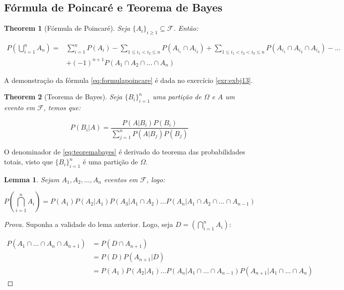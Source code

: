 \documentclass[
]{article}
\newtheorem{theorem}{Theorem}[section]
\newtheorem{lemma}{Lemma}[section]
\theoremstyle{definition}
\theoremstyle{definition}
\theoremstyle{definition}
\theoremstyle{definition}
\theoremstyle{remark}
\begin{document}
\hypertarget{fuxf3rmula-de-poincaruxe9-e-teorema-de-bayes}{%
\subsection{Fórmula de Poincaré e Teorema de Bayes}\label{fuxf3rmula-de-poincaruxe9-e-teorema-de-bayes}}

\begin{theorem}[Fórmula de Poincaré]
Seja \(\{A_{i}\}_{i \ge 1} \subseteq \mathcal{F}\). Então:

\begin{equation}
\begin{split}
P\left(\bigcup_{i=1}^{n} A_{n}\right) = &\sum_{i=1}^{n}P(A_{i}) - \sum_{1 \le i_{1} < i_{2} \le n} P(A_{i_{1}} \cap A_{i_{2}}) + \sum_{1 \le i_{1} < i_{2} < i_{3} \le n} P(A_{i_{1}} \cap A_{i_{2}} \cap A_{i_{3}}) - \dots \\
&+ (-1)^{n+1} P(A_{1} \cap A_{2} \cap \ldots \cap A_{n})
\label{eq:formulapoincare}
\end{split}
\end{equation}
\end{theorem}

A demonstração da fórmula \eqref{eq:formulapoincare} é dada no exercício \ref{exr:exbj13}.

\begin{theorem}[Teorema de Bayes]
Seja \(\{B_{i}\}_{i=1}^{n}\) uma partição de \(\Omega\) e \(A\) um evento em \(\mathcal{F}\), temos que:

\begin{equation}
P(B_{i}|A) = \frac{P(A|B_{i})P(B_{i})}{\sum_{j=1}^{n}P(A|B_{j})P(B_{j})}
\label{eq:teoremabayes}
\end{equation}
\end{theorem}

O denominador de \eqref{eq:teoremabayes} é derivado do teorema das probabilidades totais, visto que \(\{B_{i}\}_{i=1}^{n}\) é uma partição de \(\Omega\).

\begin{lemma}
Sejam \(A_{1},A_{2}, \ldots, A_{n}\) eventos em \(\mathcal{F}\), logo:

\begin{equation*}
P\left(\bigcap_{i=1}^{n}A_{i}\right) = P(A_{1})P(A_{2}|A_{1})P(A_{3}|A_{1} \cap A_{2}) \ldots P(A_{n}|A_{1} \cap A_{2} \cap \ldots \cap A_{n-1})
\end{equation*}
\end{lemma}

\begin{proof}[Prova]
Suponha a validade do lema anterior. Logo, seja \(D = (\bigcap_{i=1}^{n}A_{i})\):

\begin{align*}
P(A_{1} \cap \ldots \cap A_{n} \cap A_{n+1}) &= P(D \cap A_{n+1}) \\
&= P(D)P(A_{n+1}|D) \\
&= P(A_{1})P(A_{2}|A_{1}) \ldots P(A_{n}|A_{1} \cap \ldots \cap A_{n-1})P(A_{n+1}|A_{1} \cap \ldots \cap A_{n})
\end{align*}
\end{proof}
\end{document}
